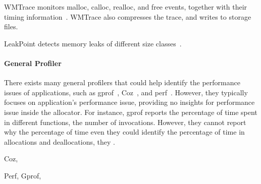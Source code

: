 \cite{1190248}


WMTrace monitors malloc, calloc, realloc, and free events, together with their timing information~\cite{Perks:2011:WAP:2186355.2186369}. WMTrace also compresses the trace, and writes to storage files. 
 

LeakPoint detects memory leaks of different size classes~\cite{Clause:2010:LPC:1806799.1806874}.

\paragraph{General Profiler} There exists many general profilers that could help identify the performance issues of applications, such as  gprof~\cite{DBLP:conf/sigplan/GrahamKM82}, Coz~\cite{Coz}, and perf~\cite{perf}. However, they typically focuses on application's performance issue, providing no insights for performance issue inside the allocator. For instance, gprof  reports the percentage of time spent in different functions, the number of invocations. However, they cannot report why the percentage of time   
even they could identify the percentage of time in allocations and deallocations, they . 

Coz, 

Perf, 
Gprof,

